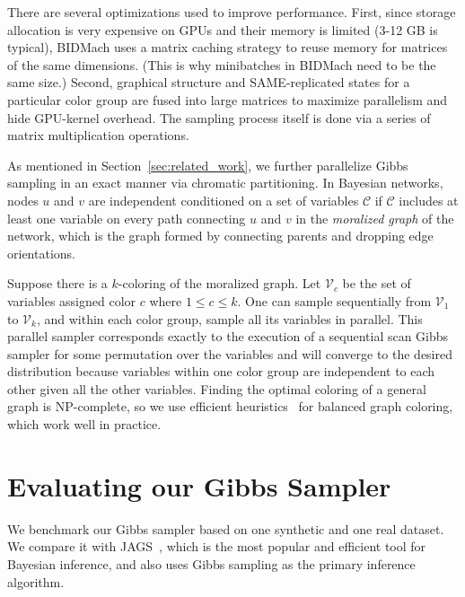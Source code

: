 \documentclass{article} %
\begin{document}
There are several optimizations used to improve performance.  First, since storage allocation is
very expensive on GPUs and their memory is limited (3-12 GB is typical), BIDMach uses a matrix
caching strategy to reuse memory for matrices of the same dimensions. (This is why minibatches in
BIDMach need to be the same size.) Second, graphical structure and SAME-replicated states for a
particular color group are fused into large matrices to maximize parallelism and hide GPU-kernel
overhead. The sampling process itself is done via a series of matrix multiplication operations.

As mentioned in Section~\ref{sec:related_work}, we further parallelize Gibbs sampling in an
exact manner via chromatic partitioning. In Bayesian networks, nodes $u$ and $v$ are independent
conditioned on a set of variables $\mathcal{C}$ if $\mathcal{C}$ includes at least one variable on
every path connecting $u$ and $v$ in the \emph{moralized graph} of the network, which is the graph
formed by connecting parents and dropping edge orientations.

Suppose there is a $k$-coloring of the moralized graph. Let $\mathcal{V}_c$ be the set of variables
assigned color $c$ where $1 \leq c \leq k$. One can sample sequentially from $\mathcal{V}_1$ to
$\mathcal{V}_k$, and within each color group, sample all its variables in parallel. This parallel
sampler corresponds exactly to the execution of a sequential scan Gibbs sampler for some permutation
over the variables and will converge to the desired distribution because variables within one color
group are independent to each other given all the other variables. Finding the optimal coloring of a
general graph is NP-complete, so we use efficient heuristics~\citep{kubale2004graph} for balanced
graph coloring, which work well in practice.




\section{Evaluating our Gibbs Sampler}\label{sec:experiments}

We benchmark our Gibbs sampler based on one synthetic and one real dataset. We compare it with
JAGS~\citep{JAGS2003}, which is the most popular and efficient tool for Bayesian inference, and also
uses Gibbs sampling as the primary inference algorithm. 

\end{document}
